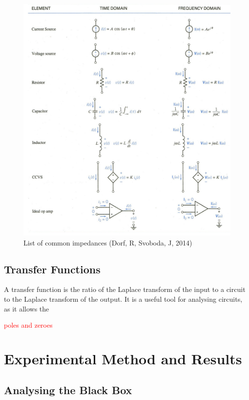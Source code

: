 \documentclass[12pt]{article} %
\begin{document}
\begin{figure}[h]
	\centering
	\includegraphics[scale=0.2]{Impedances1.jpg}
	\caption{List of common impedances (Dorf, R, Svoboda, J, 2014)}
\end{figure}



\subsection{Transfer Functions}

A transfer function is the ratio of the Laplace transform of the input to a circuit to the Laplace transform of the output. It is a useful tool for analysing circuits, as it allows the 

\textcolor{red}{poles and zeroes}

\pagebreak





\section{Experimental Method and Results}

\subsection{Analysing the Black Box}
\end{document}

